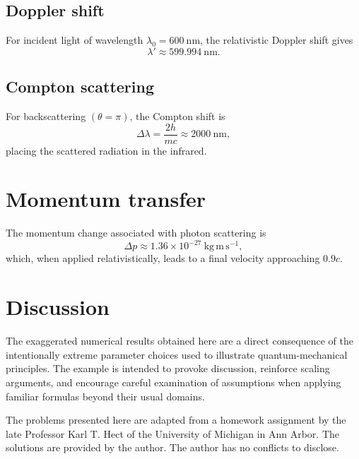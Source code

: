 \documentclass[aps,prper,twocolumn,superscriptaddress]{revtex4-2}
\begin{document}
\subsection{Doppler shift}

For incident light of wavelength $\lambda_0 = 600~\mathrm{nm}$, the relativistic Doppler shift gives
\begin{equation}
\lambda' \approx 599.994~\mathrm{nm}.
\end{equation}

\subsection{Compton scattering}

For backscattering $(\theta = \pi)$, the Compton shift is
\begin{equation}
\Delta\lambda = \frac{2h}{mc} \approx 2000~\mathrm{nm},
\end{equation}
placing the scattered radiation in the infrared.

\section{Momentum transfer}

The momentum change associated with photon scattering is
\begin{equation}
\Delta p \approx 1.36\times10^{-27}~\mathrm{kg\,m\,s^{-1}},
\end{equation}
which, when applied relativistically, leads to a final velocity approaching $0.9c$.\cite{LongairHEA}

\section{Discussion}

The exaggerated numerical results obtained here are a direct consequence of the intentionally extreme parameter choices used to illustrate quantum-mechanical principles. The example is intended to provoke discussion, reinforce scaling arguments, and encourage careful examination of assumptions when applying familiar formulas beyond their usual domains.

\begin{acknowledgments}
The problems presented here are adapted from a homework assignment by the late Professor Karl T. Hect of the University of Michigan in Ann Arbor. The solutions are provided by the author.  The author has no conflicts to disclose.
\end{acknowledgments}
\end{document}
